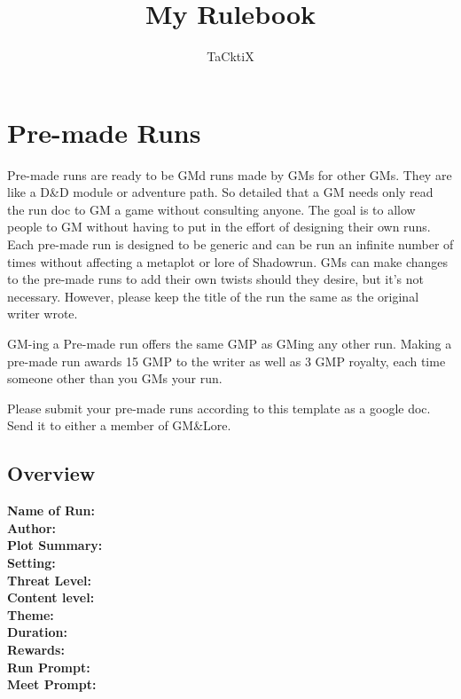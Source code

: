 \documentclass{ShadowTeXSR5}
\title{My Rulebook}
\author{TaCktiX}
\begin{document}
\srmaketitle[black]
\tableofcontents


\chapter{Pre-made Runs}

Pre-made runs are ready to be GMd runs made by GMs for other GMs. They are like a D\&D module or adventure path. So detailed that a GM needs only read the run doc to GM a game without consulting anyone. The goal is to allow people to GM without having to put in the effort of designing their own runs. Each pre-made run is designed to be generic and can be run an infinite number of times without affecting a metaplot or lore of Shadowrun. GMs can make changes to the pre-made runs to add their own twists should they desire, but it's not necessary. However, please keep the title of the run the same as the original writer wrote.

GM-ing a Pre-made run offers the same GMP as GMing any other run. Making a pre-made run awards 15 GMP to the writer as well as 3 GMP royalty, each time someone other than you GMs your run.

Please submit your pre-made runs according to this template as a google doc. Send it to either a member of GM\&Lore.


\section{Overview}
\textbf{Name of Run:}\\
\textbf{Author:}\\
\textbf{Plot Summary:}\\
\textbf{Setting:}\\
\textbf{Threat Level:}\\
\textbf{Content level:}\\
\textbf{Theme:}\\
\textbf{Duration: }\\
\textbf{Rewards:}\\
\textbf{Run Prompt:}\\
\textbf{Meet Prompt:}\\
\end{document}
